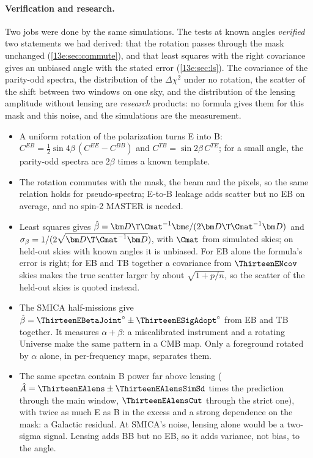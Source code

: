 \paragraph{Verification and research.} Two jobs were done by the same simulations. The tests at known
angles \emph{verified} two statements we had derived: that the rotation passes through the mask unchanged
(\cref{13e:sec:commute}), and that least squares with the right covariance gives an unbiased angle with the
stated error (\cref{13e:sec:ls}). The covariance of the parity-odd spectra, the distribution of the
$\Delta\chi^2$ under no rotation, the scatter of the shift between two windows on one sky, and the
distribution of the lensing amplitude without lensing are \emph{research} products: no formula gives them
for this mask and this noise, and the simulations are the measurement.

\begin{recap}
\begin{itemize}[itemsep=2pt]
  \item A uniform rotation of the polarization turns E into B: $C^{EB}=\tfrac12\sin4\beta\,(C^{EE}-C^{BB})$ and
        $C^{TB}=\sin2\beta\,C^{TE}$; for a small angle, the parity-odd spectra are $2\beta$ times a known template.
  \item The rotation commutes with the mask, the beam and the pixels, so the same relation holds for
        pseudo-spectra; E-to-B leakage adds scatter but no EB on average, and no spin-2 MASTER is needed.
  \item Least squares gives $\hat\beta=\bm D\T\Cmat^{-1}\bm e/(2\bm D\T\Cmat^{-1}\bm D)$ and
        $\sigma_\beta=1/(2\sqrt{\bm D\T\Cmat^{-1}\bm D})$, with $\Cmat$ from simulated skies; on held-out skies
        with known angles it is unbiased. For EB alone the formula's error is right; for EB and TB together a
        covariance from $\ThirteenENcov$ skies makes the true scatter larger by about $\sqrt{1+p/n}$, so the
        scatter of the held-out skies is quoted instead.
  \item The SMICA half-missions give $\hat\beta=\ThirteenEBetaJoint^\circ\pm\ThirteenESigAdopt^\circ$ from EB and TB together.
        It measures $\alpha+\beta$: a miscalibrated instrument and a rotating Universe make the same pattern
        in a CMB map. Only a foreground rotated by $\alpha$ alone, in per-frequency maps, separates them.
  \item The same spectra contain B power far above lensing ($\hat A=\ThirteenEAlens\pm\ThirteenEAlensSimSd$ times the
        prediction through the main window, $\ThirteenEAlensCut$ through the strict one), with twice as much E as B in
        the excess and a strong dependence on the mask: a Galactic residual. At SMICA's noise, lensing alone would be
        a two-sigma signal. Lensing adds BB but no EB, so it adds variance, not bias, to the angle.
\end{itemize}
\end{recap}

